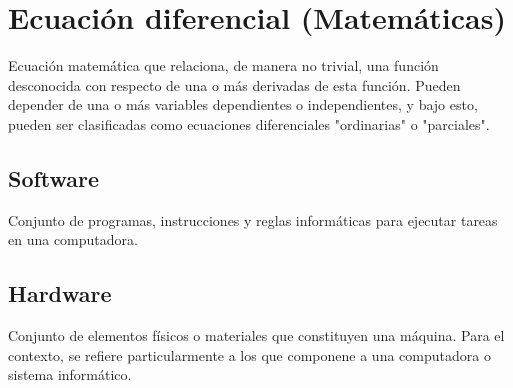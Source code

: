 
\section{Ecuación diferencial (Matemáticas)}

Ecuación matemática que relaciona, de manera no trivial, una función desconocida con respecto de una o más derivadas de esta función. Pueden depender de una o más variables dependientes o independientes, y bajo esto, pueden ser clasificadas como ecuaciones diferenciales "ordinarias" o "parciales".

\subsection{Software}
Conjunto de programas, instrucciones y reglas informáticas para ejecutar tareas en una computadora.


\subsection{Hardware}
Conjunto de elementos físicos o materiales que constituyen una máquina. Para el contexto, se refiere particularmente a los que componene a una computadora o sistema informático.


